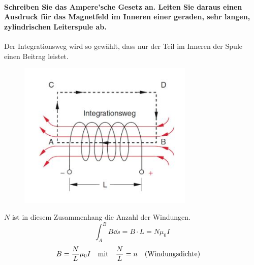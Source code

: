 \documentclass[a4paper, 11pt, ngerman, parskip=half-]{scrartcl}
\begin{document}
\paragraph{Schreiben Sie das Ampere'sche Gesetz an. Leiten Sie daraus einen Ausdruck für das
    Magnetfeld im Inneren einer geraden, sehr langen, zylindrischen Leiterspule ab.}
Der Integrationsweg wird so gewählt, dass nur der Teil im Inneren der Spule einen Beitrag leistet.
\begin{figure}[H]
    \centering
    \label{Integrationsweg}
    \includegraphics[height=7cm]{image/05/5.2.JPG}
\end{figure}
$N$ ist in diesem Zusammenhang die Anzahl der Windungen.
\begin{equation}
    \int_A^B B \dd{s} = B \cdot L = N \mu_0 I
\end{equation}
\begin{equation}
    B = \frac{N}{L}\mu_0 I \qq{mit} \frac{N}{L} = n \qq{(Windungsdichte)}
\end{equation}
\end{document}
